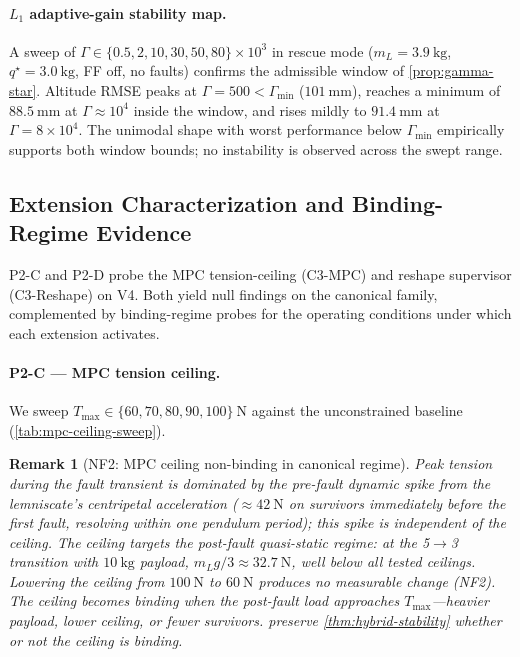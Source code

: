 \documentclass[lettersize,journal]{IEEEtran}
\newtheorem{remark}{Remark}%
\begin{document}
\paragraph{$L_1$ adaptive-gain stability map.} A sweep of $\Gamma\in\{0.5,2,10,30,50,80\}\times 10^3$ in rescue mode ($m_L=\SI{3.9}{\kilo\gram}$, $q^\star=\SI{3.0}{\kilo\gram}$, FF off, no faults) confirms the admissible window of \cref{prop:gamma-star}. Altitude RMSE peaks at $\Gamma=500<\Gamma_{\min}$ ($\SI{101}{\milli\metre}$), reaches a minimum of $\SI{88.5}{\milli\metre}$ at $\Gamma\approx 10^4$ inside the window, and rises mildly to $\SI{91.4}{\milli\metre}$ at $\Gamma=8\times 10^4$. The unimodal shape with worst performance below $\Gamma_{\min}$ empirically supports both window bounds; no instability is observed across the swept range.

\subsection{Extension Characterization and Binding-Regime
  Evidence}
\label{sec:VI-H}
\label{sec:VI-F}

P2-C and P2-D probe the MPC tension-ceiling (C3-MPC) and reshape supervisor (C3-Reshape) on V4. Both yield null findings on the canonical family, complemented by binding-regime probes for the operating conditions under which each extension activates.

\paragraph{P2-C --- MPC tension ceiling.} We sweep $T_{\max} \in \{60, 70, 80, 90, 100\}~\si{\newton}$ against the unconstrained baseline (\cref{tab:mpc-ceiling-sweep}).

\begin{remark}[NF2: MPC ceiling non-binding in canonical regime]
\label{rem:mpc-null}
  Peak tension during the fault transient is dominated by the pre-fault dynamic spike from the lemniscate's centripetal acceleration ($\approx \SI{42}{\newton}$ on survivors immediately before the first fault, resolving within one pendulum period); this spike is independent of the ceiling. The ceiling targets the post-fault quasi-static regime: at the 5$\to$3 transition with $\SI{10}{\kilo\gram}$ payload, $m_L g / 3 \approx \SI{32.7}{\newton}$, well below all tested ceilings. Lowering the ceiling from $\SI{100}{\newton}$ to $\SI{60}{\newton}$ produces no measurable change (NF2). The ceiling becomes binding when the post-fault load approaches $T_{\max}$---heavier payload, lower ceiling, or fewer survivors.  preserve \cref{thm:hybrid-stability} whether or not the ceiling is binding.
\end{remark}
\end{document}
